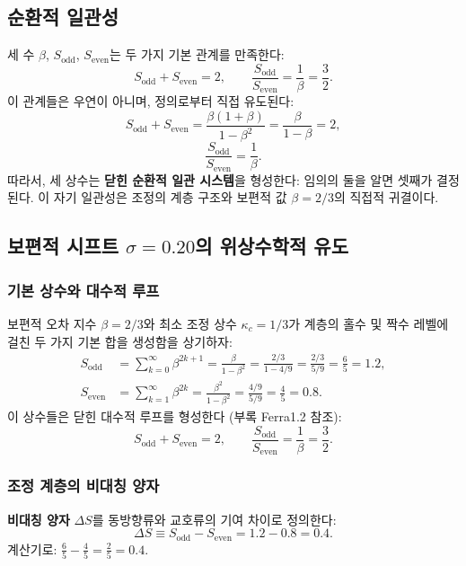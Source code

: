 \documentclass[11pt,a4paper]{article}
\begin{document}
	\subsection{순환적 일관성}
	세 수 \(\beta\), \(S_{\text{odd}}\), \(S_{\text{even}}\)는 두 가지 기본 관계를 만족한다:
	\[
	S_{\text{odd}} + S_{\text{even}} = 2,\qquad
	\frac{S_{\text{odd}}}{S_{\text{even}}} = \frac{1}{\beta} = \frac{3}{2}.
	\]
	이 관계들은 우연이 아니며, 정의로부터 직접 유도된다:
	\[
	S_{\text{odd}} + S_{\text{even}} = \frac{\beta(1+\beta)}{1-\beta^2} = \frac{\beta}{1-\beta}=2,
	\]
	\[
	\frac{S_{\text{odd}}}{S_{\text{even}}} = \frac{1}{\beta}.
	\]
	따라서, 세 상수는 \textbf{닫힌 순환적 일관 시스템}을 형성한다: 임의의 둘을 알면 셋째가 결정된다. 이 자기 일관성은 조정의 계층 구조와 보편적 값 \(\beta=2/3\)의 직접적 귀결이다.
	
	\subsection{보편적 시프트 \(\sigma = 0.20\)의 위상수학적 유도}
	\label{sec:sigma_topology}
	
	\subsubsection{기본 상수와 대수적 루프}
	
	보편적 오차 지수 \(\beta = 2/3\)와 최소 조정 상수 \(\kappa_c = 1/3\)가 계층의 홀수 및 짝수 레벨에 걸친 두 가지 기본 합을 생성함을 상기하자:
	\begin{align}
		S_{\mathrm{odd}} &= \sum_{k=0}^{\infty} \beta^{2k+1} = \frac{\beta}{1-\beta^2} = \frac{2/3}{1-4/9} = \frac{2/3}{5/9} = \frac{6}{5} = 1.2, \label{eq:Sodd_again}\\
		S_{\mathrm{even}} &= \sum_{k=1}^{\infty} \beta^{2k} = \frac{\beta^2}{1-\beta^2} = \frac{4/9}{5/9} = \frac{4}{5} = 0.8. \label{eq:Seven_again}
	\end{align}
	이 상수들은 닫힌 대수적 루프를 형성한다 (부록 Ferra1.2 참조):
	\[
	S_{\mathrm{odd}} + S_{\mathrm{even}} = 2, \qquad \frac{S_{\mathrm{odd}}}{S_{\mathrm{even}}} = \frac{1}{\beta} = \frac{3}{2}.
	\]
	
	\subsubsection{조정 계층의 비대칭 양자}
	
	\textbf{비대칭 양자} \(\Delta S\)를 동방향류와 교호류의 기여 차이로 정의한다:
	\[
	\Delta S \equiv S_{\mathrm{odd}} - S_{\mathrm{even}} = 1.2 - 0.8 = 0.4.
	\]
	계산기로: \(\frac{6}{5} - \frac{4}{5} = \frac{2}{5} = 0.4.\)
	
\end{document}
